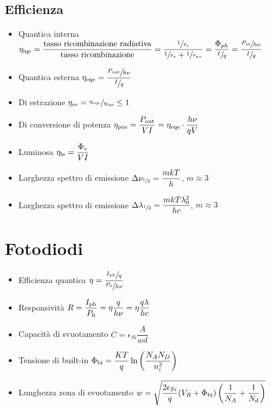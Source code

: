 \documentclass{article}
\begin{document}
\subsection{Efficienza}
\begin{itemize}
  \item Quantica interna \( \eta_{\textnormal{iqe}} = \dfrac{\textnormal{tasso ricombinazione radiativa}}{\textnormal{tasso ricombinazione}} = \dfrac{\sfrac{1}{\tau_r}}{\sfrac{1}{\tau_r} + \sfrac{1}{\tau_{nr}}} = \dfrac{\Phi_{ph}}{\sfrac{I}{q}} = \dfrac{\sfrac{P_{\textnormal{in}}}{h \nu}}{\sfrac{I}{q}}\)
  \item Quantica esterna \( \eta_{\textnormal{eqe}} = \dfrac{\sfrac{P_{\textnormal{out}}}{h \nu}}{\sfrac{I}{q}}\)
  \item Di estrazione \( \eta_{\textnormal{ee}} = \sfrac{ \eta_{\textnormal{eqe}}}{\eta_{\textnormal{iqe}}} \leq 1 \)
  \item Di conversione di potenza \( \eta_{\textnormal{pce}} = \dfrac{P_{\textnormal{out}}}{V I} = \eta_{\textnormal{eqe}} \cdot \dfrac{h \nu}{q V}\)
  \item Luminosa \( \eta_{\textnormal{le}} = \dfrac{\Phi_v}{V I} \)
  \item Larghezza spettro di emissione \( \Delta \nu_{\sfrac{1}{2}} = \dfrac{m k T}{h} \), \(m \approx 3 \)
  \item Larghezza spettro di emissione \( \Delta \lambda_{\sfrac{1}{2}} = \dfrac{m k T \lambda_0^2}{h c} \), \(m \approx 3 \)
\end{itemize}

\newpage

\section{Fotodiodi}
\begin{itemize}
  \item Efficienza quantica \( \eta = \dfrac{\sfrac{I_{\textnormal{ph}}}{q}}{\sfrac{P_0}{h \nu}} \)
  \item Responsività \( R = \dfrac{I_{\textnormal{ph}}}{P_0} = \eta \dfrac{q}{h \nu} = \eta \dfrac{q \lambda}{h c} \)
  \item Capacità di svuotamento \( C = \epsilon_{Si} \dfrac{A}{w d} \)
  \item Tensione di built-in \( \Phi_{\textnormal{bi}} = \dfrac{KT}{q} \ln\left( \dfrac{N_A N_D}{n_i^ 2}\right) \)
  \item Lunghezza zona di svuotamento \( w = \sqrt{ \dfrac{2 \epsilon_{Si}}{q} (V_R +  \Phi_{\textnormal{bi}}) \left( \dfrac{1}{N_A} + \dfrac{1}{N_d} \right) } \)
\end{itemize}
\end{document}
